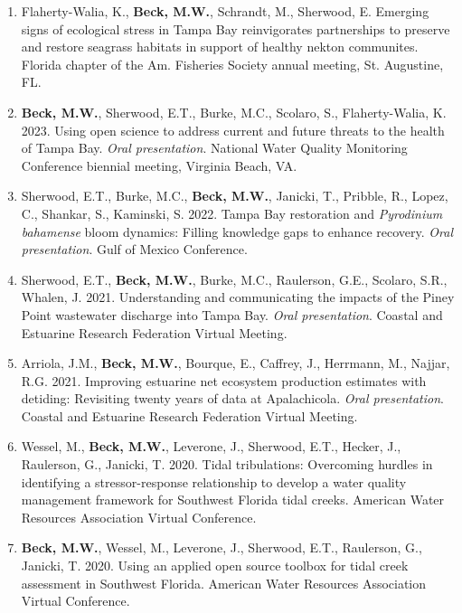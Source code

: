 \documentclass[letterpaper,12pt]{article}
\begin{document}
\begin{enumerate}
\item Flaherty-Walia, K., {\bf Beck, M.W.}, Schrandt, M., Sherwood, E. Emerging signs of ecological stress in Tampa Bay reinvigorates partnerships to preserve and restore seagrass habitats in support of healthy nekton communites. Florida chapter of the Am. Fisheries Society annual meeting, St. Augustine, FL.

\item {\bf Beck, M.W.}, Sherwood, E.T., Burke, M.C., Scolaro, S., Flaherty-Walia, K. 2023. Using open science to address current and future threats to the health of Tampa Bay. \textit{Oral presentation}. National Water Quality Monitoring Conference biennial meeting, Virginia Beach, VA.

\item Sherwood, E.T., Burke, M.C., {\bf Beck, M.W.}, Janicki, T., Pribble, R., Lopez, C., Shankar, S., Kaminski, S. 2022. Tampa Bay restoration and \textit{Pyrodinium bahamense} bloom dynamics: Filling knowledge gaps to enhance recovery. \textit{Oral presentation}. Gulf of Mexico Conference.

\item Sherwood, E.T., {\bf Beck, M.W.}, Burke, M.C., Raulerson, G.E., Scolaro, S.R., Whalen, J. 2021. Understanding and communicating the impacts of the Piney Point wastewater discharge into Tampa Bay. \textit{Oral presentation}. Coastal and Estuarine Research Federation Virtual Meeting.

\item Arriola, J.M., {\bf Beck, M.W.}, Bourque, E., Caffrey, J., Herrmann, M., Najjar, R.G. 2021. Improving estuarine net ecosystem production estimates with detiding: Revisiting twenty years of data at Apalachicola. \textit{Oral presentation}. Coastal and Estuarine Research Federation Virtual Meeting.

\item Wessel, M., \textbf{Beck, M.W.}, Leverone, J., Sherwood, E.T., Hecker, J., Raulerson, G., Janicki, T. 2020. Tidal tribulations: Overcoming hurdles in identifying a stressor-response relationship to develop a water quality management framework for Southwest Florida tidal creeks. American Water Resources Association Virtual Conference. 

\item \textbf{Beck, M.W.}, Wessel, M., Leverone, J., Sherwood, E.T., Raulerson, G., Janicki, T. 2020. Using an applied open source toolbox for tidal creek assessment in Southwest Florida. American Water Resources Association Virtual Conference. 


\end{enumerate}
\end{document}
